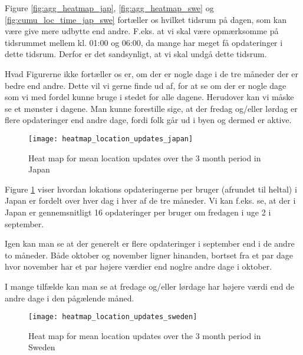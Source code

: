 Figure \ref{fig:agg_heatmap_jap}, \ref{fig:agg_heatmap_swe} og \ref{fig:cumu_loc_time_jap_swe} fortæller os hvilket tidsrum på dagen, som kan være give mere udbytte end andre. F.eks. at vi skal være opmærksomme på tidsrummet mellem kl. 01:00 og 06:00, da mange har meget få opdateringer i dette tidsrum. Derfor er det sandsynligt, at vi skal undgå dette tidsrum. 

Hvad Figurerne ikke fortæller os er, om der er nogle dage i de tre måneder der er bedre end andre. Dette vil vi gerne finde ud af, for at se om der er nogle dage som vi med fordel kunne bruge i stedet for alle dagene. Herudover kan vi måske se et mønster i dagene. Man kunne forestille sige, at der fredag og/eller lørdag er flere opdateringer end andre dage, fordi folk går ud i byen og dermed er aktive. 


\begin{figure}[H]
    \hspace*{-1.5cm}
    \centering
    \texttt{[image: heatmap\_location\_updates\_japan]}
    \caption{Heat map for mean location updates over the 3 month period in Japan}
    \label{fig:heatmap_jap}
\end{figure}

Figure \ref{fig:heatmap_jap} viser hvordan lokations opdateringerne per bruger (afrundet til heltal) i Japan er fordelt over hver dag i hver af de tre måneder. Vi kan f.eks. se, at der i Japan er gennemsnitligt 16 opdateringer per bruger om fredagen i uge 2 i september. 

Igen kan man se at der generelt er flere opdateringer i september end i de andre to måneder. Både oktober og november ligner hinanden, bortset fra et par dage hvor november har et par højere værdier end noglre andre dage i oktober. 

I mange tilfælde kan man se at fredage og/eller lørdage har højere værdi end de andre dage i den pågælende måned.






\begin{figure}[H]
    \hspace*{-1.5cm}
    \centering
    \texttt{[image: heatmap\_location\_updates\_sweden]}
    \caption{Heat map for mean location updates over the 3 month period in Sweden}
    \label{fig:heatmap_swe}
\end{figure}

